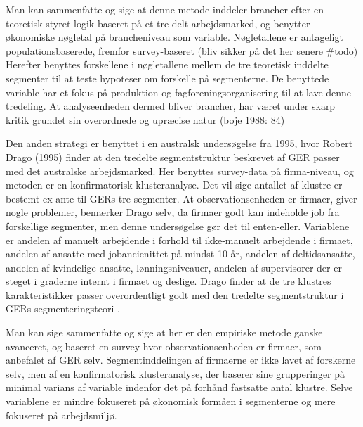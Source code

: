 Man kan sammenfatte og sige at denne metode inddeler brancher efter en teoretisk styret logik baseret på et tre-delt arbejdsmarked, og benytter økonomiske nøgletal på brancheniveau som variable. Nøgletallene er antageligt populationsbaserede, fremfor survey-baseret (bliv sikker på det her senere \#todo) Herefter benyttes forskellene i nøgletallene mellem de tre teoretisk inddelte segmenter til at teste hypoteser om forskelle på segmenterne. De benyttede variable har et fokus på produktion og fagforeningsorganisering til at lave denne tredeling. At analyseenheden dermed bliver brancher, har været under skarp kritik grundet sin overordnede og upræcise natur (boje 1988: 84)


Den anden strategi er benyttet i en australsk undersøgelse fra 1995, hvor Robert Drago (1995) finder at den tredelte segmentstruktur beskrevet af GER passer med det australske arbejdsmarked. Her benyttes survey-data på firma-niveau, og metoden er en  konfirmatorisk klusteranalyse. Det vil sige antallet af klustre er bestemt ex ante til GERs tre segmenter. At observationsenheden er firmaer, giver nogle problemer, bemærker Drago selv, da firmaer godt kan indeholde job fra forskellige segmenter, men denne undersøgelse gør det til enten-eller. Variablene er andelen af manuelt arbejdende i forhold til ikke-manuelt arbejdende i firmaet, andelen af ansatte med jobancienittet på mindst 10 år, andelen af deltidsansatte, andelen af kvindelige ansatte, lønningsniveauer, andelen af supervisorer der er steget i graderne internt i firmaet og deslige. Drago finder at de tre klustres karakteristikker passer overordentligt godt med den tredelte segmentstruktur i GERs segmenteringsteori \parencite[59]{Drago1995}. 

Man kan sige sammenfatte og sige at her er den empiriske metode ganske avanceret, og baseret en survey hvor observationsenheden er firmaer, som anbefalet af GER selv. Segmentinddelingen af firmaerne er ikke lavet af forskerne selv, men af en konfirmatorisk klusteranalyse, der baserer sine grupperinger på minimal varians af variable indenfor det på forhånd fastsatte antal klustre. Selve variablene er mindre fokuseret på økonomisk formåen i segmenterne og mere fokuseret på arbejdsmiljø. 

